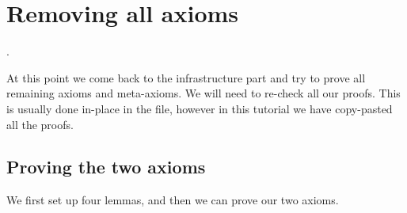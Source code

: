 \documentclass[12pt]{report}
\begin{document}
\section{Removing all axioms}


\begin{coqdoccode}
\coqdocemptyline
\coqdocnoindent
{} .\coqdoceol
\coqdocemptyline
\end{coqdoccode}
At this point we come back to the infrastructure part and try
    to prove all remaining axioms and meta-axioms. We will need to
    re-check all our proofs. This is usually done in-place in the
    file, however in this tutorial we have copy-pasted all the proofs.

\begin{coqdoccode}
\coqdocemptyline
\end{coqdoccode}
\subsection{Proving the two axioms}



 We first set up four lemmas, and then we can prove our two axioms. 
\end{document}
